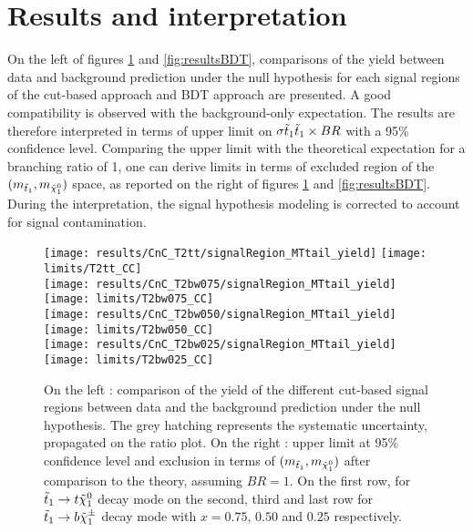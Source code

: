     \section{Results and interpretation \label{sec:analysis_results}}

    On the left of figures \ref{fig:resultsCnC} and \ref{fig:resultsBDT}, comparisons
    of the yield between data and background prediction under the null hypothesis 
    for each signal regions of the cut-based approach and BDT approach are presented. 
    A good compatibility is observed with the background-only expectation. The results 
    are therefore interpreted in terms of upper limit on $\sigma{\tilde{t}_1\tilde{t}_1} \times BR$ 
    with a 95\% confidence level.  Comparing the upper limit with the theoretical 
    expectation for a branching ratio of 1, one can derive limits in terms of excluded 
    region of the $(m_{\tilde{t}_1}, m_{\tilde{\chi}_1^0})$ space, as reported on the right 
    of figures \ref{fig:resultsCnC} and \ref{fig:resultsBDT}. During the interpretation, 
    the signal hypothesis modeling is corrected to account for signal contamination. 
   
    \begin{figure}[h!]
        \centering
        \texttt{[image: results/CnC\_T2tt/signalRegion\_MTtail\_yield]}
        \texttt{[image: limits/T2tt\_CC]}\\
        \texttt{[image: results/CnC\_T2bw075/signalRegion\_MTtail\_yield]}
        \texttt{[image: limits/T2bw075\_CC]}\\
        \texttt{[image: results/CnC\_T2bw050/signalRegion\_MTtail\_yield]}
        \texttt{[image: limits/T2bw050\_CC]}\\
        \texttt{[image: results/CnC\_T2bw025/signalRegion\_MTtail\_yield]}
        \texttt{[image: limits/T2bw025\_CC]}\\
        \caption{On the left : comparison of the yield of the different cut-based signal 
        regions between data and the background prediction under the null hypothesis. The
        grey hatching represents the systematic uncertainty, propagated on the ratio plot.
        On the right : upper limit at 95\% confidence level and exclusion in terms of 
        $(m_{\tilde{t}_1},m_{\tilde{\chi}_1^0})$ after comparison to the theory, assuming
        $BR = 1$. On the first row, for $\tilde{t}_1 \rightarrow t \tilde{\chi}_1^0$ decay mode on 
        the second, third and last row for $\tilde{t}_1 \rightarrow b \tilde{\chi}_1^\pm$ decay mode 
        with $x=0.75$, $0.50$ and $0.25$ respectively.}
        \label{fig:resultsCnC}
    \end{figure}

